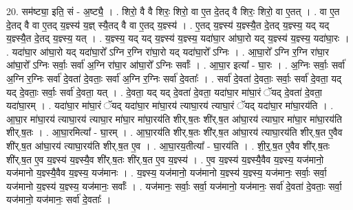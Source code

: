\documentclass[17pt]{extarticle}
\begin{document}
20. सम॑ष्ट्या॒ इति॒ सं - अ॒ष्ट्यै॒ । . शिरो॒ वै वै शिरः॒ शिरो॒ वा ए॒त दे॒तद् वै शिरः॒ शिरो॒ वा ए॒तत् । . वा ए॒त दे॒तद् वै वा ए॒तद् य॒ज्ञ्स्य॑ य॒ज्ञ् स्यै॒तद् वै वा ए॒तद् य॒ज्ञ्स्य॑ । . ए॒तद् य॒ज्ञ्स्य॑ य॒ज्ञ्स्यै॒त दे॒तद् य॒ज्ञ्स्य॒ यद् यद् य॒ज्ञ्स्यै॒त दे॒तद् य॒ज्ञ्स्य॒ यत् । . य॒ज्ञ्स्य॒ यद् यद् य॒ज्ञ्स्य॑ य॒ज्ञ्स्य॒ यदा॑घा॒र आ॑घा॒रो यद् य॒ज्ञ्स्य॑ य॒ज्ञ्स्य॒ यदा॑घा॒रः । . यदा॑घा॒र आ॑घा॒रो यद् यदा॑घा॒रो᳚ ऽग्नि र॒ग्नि रा॑घा॒रो यद् यदा॑घा॒रो᳚ ऽग्निः । . आ॒घा॒रो᳚ ऽग्नि र॒ग्नि रा॑घा॒र आ॑घा॒रो᳚ ऽग्निः सर्वाः॒ सर्वा॑ अ॒ग्नि रा॑घा॒र आ॑घा॒रो᳚ ऽग्निः सर्वाः᳚ । . आ॒घा॒र इत्या᳚ - घा॒रः । . अ॒ग्निः सर्वाः॒ सर्वा॑ अ॒ग्नि र॒ग्निः सर्वा॑ दे॒वता॑ दे॒वताः॒ सर्वा॑ अ॒ग्नि र॒ग्निः सर्वा॑ दे॒वताः᳚ । . सर्वा॑ दे॒वता॑ दे॒वताः॒ सर्वाः॒ सर्वा॑ दे॒वता॒ यद् यद् दे॒वताः॒ सर्वाः॒ सर्वा॑ दे॒वता॒ यत् । . दे॒वता॒ यद् यद् दे॒वता॑ दे॒वता॒ यदा॑घा॒र मा॑घा॒रं ॅयद् दे॒वता॑ दे॒वता॒ यदा॑घा॒रम् । . यदा॑घा॒र मा॑घा॒रं ॅयद् यदा॑घा॒र मा॑घा॒रय॑ त्याघा॒रय॑ त्याघा॒रं ॅयद् यदा॑घा॒र मा॑घा॒रय॑ति । . आ॒घा॒र मा॑घा॒रय॑ त्याघा॒रय॑ त्याघा॒र मा॑घा॒र मा॑घा॒रय॑ति शीर्.ष॒तः शी॑र्.ष॒त आ॑घा॒रय॑ त्याघा॒र मा॑घा॒र मा॑घा॒रय॑ति शीर्.ष॒तः । . आ॒घा॒रमित्या᳚ - घा॒रम् । . आ॒घा॒रय॑ति शीर्.ष॒तः शी॑र्.ष॒त आ॑घा॒रय॑ त्याघा॒रय॑ति शीर्.ष॒त ए॒वैव शी॑र्.ष॒त आ॑घा॒रय॑ त्याघा॒रय॑ति शीर्.ष॒त ए॒व । . आ॒घा॒रय॒तीत्या᳚ - घा॒रय॑ति । . शी॒र्॒.ष॒त ए॒वैव शी॑र्.ष॒तः शी॑र्.ष॒त ए॒व य॒ज्ञ्स्य॑ य॒ज्ञ्स्यै॒व शी॑र्.ष॒तः शी॑र्.ष॒त ए॒व य॒ज्ञ्स्य॑ । . ए॒व य॒ज्ञ्स्य॑ य॒ज्ञ्स्यै॒वैव य॒ज्ञ्स्य॒ यज॑मानो॒ यज॑मानो य॒ज्ञ्स्यै॒वैव य॒ज्ञ्स्य॒ यज॑मानः । . य॒ज्ञ्स्य॒ यज॑मानो॒ यज॑मानो य॒ज्ञ्स्य॑ य॒ज्ञ्स्य॒ यज॑मानः॒ सर्वाः॒ सर्वा॒ यज॑मानो य॒ज्ञ्स्य॑ य॒ज्ञ्स्य॒ यज॑मानः॒ सर्वाः᳚ । . यज॑मानः॒ सर्वाः॒ सर्वा॒ यज॑मानो॒ यज॑मानः॒ सर्वा॑ दे॒वता॑ दे॒वताः॒ सर्वा॒ यज॑मानो॒ यज॑मानः॒ सर्वा॑ दे॒वताः᳚ । \newline
\end{document}
